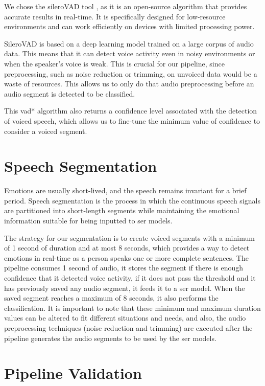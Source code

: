 We chose the sileroVAD tool \cite{SileroVAD}, as it is an open-source algorithm that provides accurate results in real-time. It is specifically designed for low-resource environments and can work efficiently on devices with limited processing power.

SileroVAD is based on a deep learning model trained on a large corpus of audio data. This means that it can detect voice activity even in noisy environments or when the speaker's voice is weak. This is crucial for our pipeline, since preprocessing, such as noise reduction or trimming, on unvoiced data would be a waste of resources. This allows us to only do that audio preprocessing before an audio segment is detected to be classified.

This \ac{vad*} algorithm also returns a confidence level associated with the detection of voiced speech, which allows us to fine-tune the minimum value of confidence to consider a voiced segment.

\section{Speech Segmentation}

Emotions are usually short-lived, and the speech remains invariant for a brief period. Speech segmentation is the process in which the continuous speech signals are partitioned into short-length segments while maintaining the emotional information suitable for being inputted to \ac{ser} models.

The strategy for our segmentation is to create voiced segments with a minimum of 1 second of duration and at most 8 seconds, which provides a way to detect emotions in real-time as a person speaks one or more complete sentences. The pipeline consumes 1 second of audio, it stores the segment if there is enough confidence that it detected voice activity, if it does not pass the threshold and it has previously saved any audio segment, it feeds it to a \ac{ser} model. When the saved segment reaches a maximum of 8 seconds, it also performs the classification. It is important to note that these minimum and maximum duration values can be altered to fit different situations and needs, and also, the audio preprocessing techniques (noise reduction and trimming) are executed after the pipeline generates the audio segments to be used by the \ac{ser} models.


\section{Pipeline Validation}

